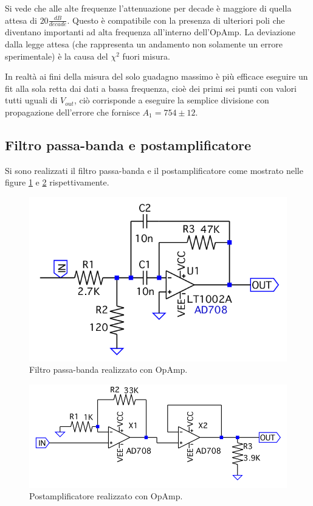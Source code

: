 \documentclass[10pt,a4paper]{article}
\begin{document}
Si vede che alle alte frequenze l'attenuazione per decade è maggiore di quella attesa di $20\frac{dB}{decade}$. Questo è compatibile con la presenza di ulteriori poli che diventano importanti ad alta frequenza all'interno dell'OpAmp. La deviazione dalla legge attesa (che rappresenta un andamento non solamente un errore sperimentale) è la causa del $\chi^2$ fuori misura.

In realtà ai fini della misura del solo guadagno massimo è più efficace eseguire un fit alla sola retta dai dati a bassa frequenza, cioè dei primi sei punti con valori tutti uguali di $V_{out}$, ciò corrisponde a eseguire la semplice divisione con propagazione dell'errore che fornisce $A_1 = 754 \pm 12$.

\subsection{Filtro passa-banda e postamplificatore}
Si sono realizzati il filtro passa-banda e il postamplificatore come mostrato nelle figure \ref{banda} e \ref{postamp} rispettivamente.

\begin{figure}[!htb]
\centering
\includegraphics[scale=0.5]{banda.png}
\caption{Filtro passa-banda realizzato con OpAmp.\label{banda}}
\end{figure}


\begin{figure}[!htb]
\centering
\includegraphics[scale=0.5]{postamp.png}
\caption{Postamplificatore realizzato con OpAmp.\label{postamp}}
\end{figure}
\end{document}
